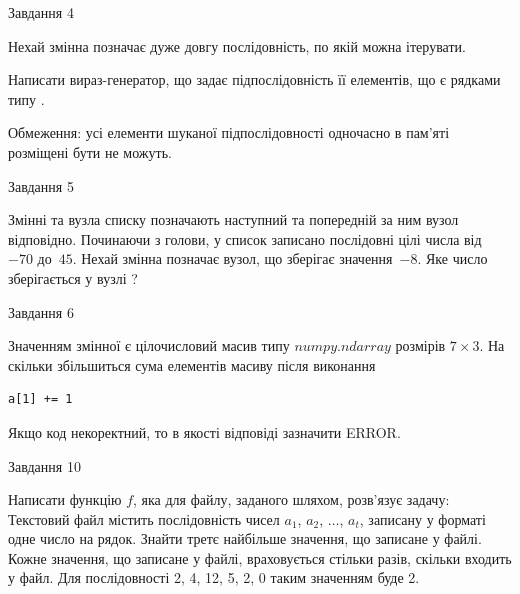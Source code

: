 \documentclass[12pt, ukrainian]{article}
\begin{document}
{\begin{minipage}[t]{8.0cm}
\begin{verbatim}
\end{verbatim}            

\end{minipage}


               
{\begin{center}Завдання {4}\end{center}}
\vspace{-4mm}
Нехай змінна  позначає дуже довгу послідовність, по якій можна ітерувати.

Написати вираз-генератор, що задає підпослідовність її елементів, що є рядками типу .

Обмеження: усі елементи шуканої підпослідовності одночасно в пам'яті розміщені бути не можуть.\par

\vspace{10mm}
               
{\begin{center}Завдання {5}\end{center}}
\vspace{-4mm}
Змінні  та  вузла списку позначають наступний та попередній за ним вузол відповідно. Починаючи з голови, у список записано послідовні цілі числа від~$-70$ до~$45$. Нехай змінна  позначає вузол, що зберігає значення~$-8$.
Яке число зберігається у вузлі  ?\par

               
{\begin{center}Завдання {6}\end{center}}
\vspace{-4mm}
Значенням змінної  є цілочисловий масив типу $numpy.ndarray$ розмірів $7{\times}3$. На скільки збільшиться сума елементів масиву  після виконання
\begin{verbatim}
a[1] += 1
\end{verbatim}


Якщо код некоректний, то в якості відповіді зазначити ERROR.\par

               
{\begin{center}Завдання {10}\end{center}}
\vspace{-4mm}

Написати функцію $f$, яка для файлу, заданого шляхом, розв’язує задачу:\\ Текстовий файл містить послідовність чисел $a_1$, $a_2$, $\ldots$, $a_t$, записану у форматі одне число на рядок. Знайти третє найбільше значення, що записане у файлі. Кожне значення, що записане у файлі, враховується стільки разів, скільки входить у файл. Для послідовності 2, 4, 12, 5, 2, 0 таким значенням буде 2.

}
\end{document}
